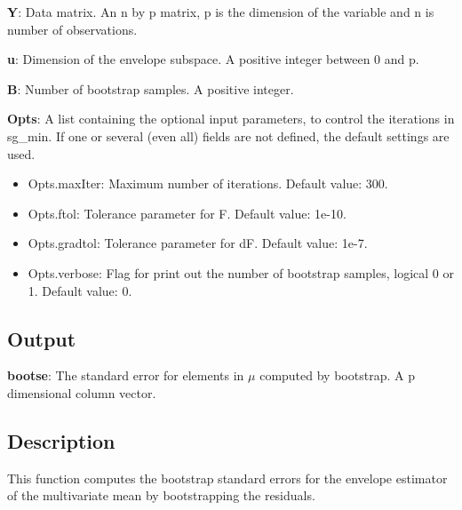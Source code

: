 \documentclass[a4paper,11pt,openany]{memoir}
\begin{document}
\begin{par}
\textbf{Y}: Data matrix. An n by p matrix, p is the dimension of the variable and n is number of observations.
\end{par} \vspace{1em}
\begin{par}
\textbf{u}: Dimension of the envelope subspace.  A positive integer between 0 and p.
\end{par} \vspace{1em}
\begin{par}
\textbf{B}: Number of bootstrap samples.  A positive integer.
\end{par} \vspace{1em}
\begin{par}
\textbf{Opts}: A list containing the optional input parameters, to control the iterations in sg\_min. If one or several (even all) fields are not defined, the default settings are used.
\end{par} \vspace{1em}
\begin{itemize}
\setlength{\itemsep}{-1ex}
   \item Opts.maxIter: Maximum number of iterations.  Default value: 300.
   \item Opts.ftol: Tolerance parameter for F.  Default value: 1e-10.
   \item Opts.gradtol: Tolerance parameter for dF.  Default value: 1e-7.
   \item Opts.verbose: Flag for print out the number of bootstrap samples, logical 0 or 1. Default value: 0.
\end{itemize}


\subsection*{Output}

\begin{par}
\textbf{bootse}: The standard error for elements in $\mu$ computed by bootstrap.  A p dimensional column vector.
\end{par} \vspace{1em}


\subsection*{Description}

\begin{par}
This function computes the bootstrap standard errors for the envelope estimator of the multivariate mean by bootstrapping the residuals.
\end{par} \vspace{1em}
\end{document}
